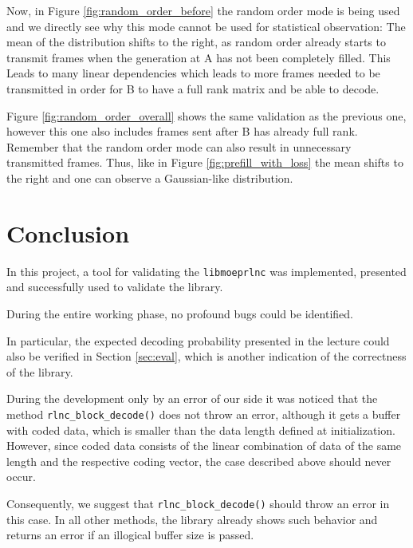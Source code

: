 \documentclass[a4paper,english,10pt]{tumarticle}
\begin{document}
Now, in Figure \ref{fig:random_order_before} the random order mode is being used and we directly see
why this mode cannot be used for statistical observation: The mean of the distribution shifts to the
right, as random order already starts to transmit frames when the generation at A has not been
completely filled. This Leads to many linear dependencies which leads to more frames needed to be
transmitted in order for B to have a full rank matrix and be able to decode.

Figure \ref{fig:random_order_overall} shows the same validation as the previous one, however this
one also includes frames sent after B has already full rank. Remember that the random order mode can
also result in unnecessary transmitted frames. Thus, like in Figure \ref{fig:prefill_with_loss} the
mean shifts to the right and one can observe a Gaussian-like distribution.



\section{Conclusion}\label{con} In this project, a tool for validating the \texttt{libmoeprlnc} was
implemented, presented and successfully used to validate the library. 

During the entire working phase, no profound bugs could be identified.

In particular, the expected decoding probability presented in the lecture could also be verified in
Section \ref{sec:eval}, which is another indication of the correctness of the library.

During the development only by an error of our side it was noticed that the method
\texttt{rlnc\_block\_decode()} does not throw an error, although it gets a buffer with coded data,
which is smaller than the data length defined at initialization. However, since coded data consists
of the linear combination of data of the same length and the respective coding vector, the case
described above should never occur.

Consequently, we suggest that \texttt{rlnc\_block\_decode()} should throw an error in this case. In
all other methods, the library already shows such behavior and returns an error if an illogical
buffer size is passed.
\end{document}
